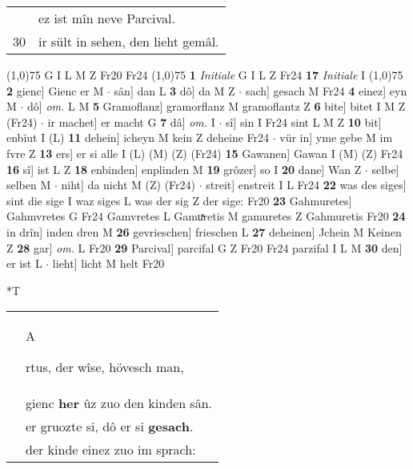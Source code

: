 \documentclass[8pt,a4paper,notitlepage]{article}
\begin{document}
\begin{table}[ht]
\begin{minipage}[t]{0.5\linewidth}
\begin{tabular}{rl}
 & ez ist mîn neve Parcival.\\ 
30 & ir sült in sehen, den lieht gemâl.\\ 
\end{tabular}
\scriptsize
\line(1,0){75} \newline
G I L M Z Fr20 Fr24 \newline
\line(1,0){75} \newline
\textbf{1} \textit{Initiale} G I L Z Fr24  \textbf{17} \textit{Initiale} I  \newline
\line(1,0){75} \newline
\textbf{2} gienc] Gienc er M  $\cdot$ sân] dan L \textbf{3} dô] da M Z  $\cdot$ sach] gesach M Fr24 \textbf{4} einez] eyn M  $\cdot$ dô] \textit{om.} L M \textbf{5} Gramoflanz] gramorflanz M gramoflantz Z \textbf{6} bite] bitet I M Z (Fr24)  $\cdot$ ir machet] er macht G \textbf{7} dâ] \textit{om.} I  $\cdot$ sî] sin I Fr24 sint L M Z \textbf{10} bit] enbiut I (L) \textbf{11} dehein] icheyn M kein Z deheine Fr24  $\cdot$ vür in] yme gebe M im fvre Z \textbf{13} ers] er si alle I (L) (M) (Z) (Fr24) \textbf{15} Gawanen] Gawan I (M) (Z) Fr24 \textbf{16} sî] ist L Z \textbf{18} enbinden] enplinden M \textbf{19} grôzer] so I \textbf{20} dane] Wan Z  $\cdot$ selbe] selben M  $\cdot$ niht] da nicht M (Z) (Fr24)  $\cdot$ streit] enstreit I L Fr24 \textbf{22} was des siges] sint die sige I waz siges L was der sig Z der sige: Fr20 \textbf{23} Gahmuretes] Gahmvretes G Fr24 Gamvretes L Gamuͯretis M gamuretes Z Gahmuretis Fr20 \textbf{24} in drîn] inden dren M \textbf{26} gevrieschen] frieschen L \textbf{27} deheinen] Jchein M Keinen Z \textbf{28} gar] \textit{om.} L Fr20 \textbf{29} Parcival] parcifal G Z Fr20 Fr24 parzifal I L M \textbf{30} den] er ist L  $\cdot$ lieht] licht M helt Fr20 \newline
\end{minipage}
\hspace{0.5cm}
\begin{minipage}[t]{0.5\linewidth}
\small
\begin{center}*T
\end{center}
\begin{tabular}{rl}
 & \begin{large}A\end{large}rtus, der wîse, hövesch man,\\ 
 & gienc \textbf{her} ûz zuo den kinden sân.\\ 
 & er gruozte si, dô er si \textbf{gesach}.\\ 
 & der kinde einez zuo im sprach:\\ 

\end{tabular}
\end{minipage}
\end{table}
\end{document}
